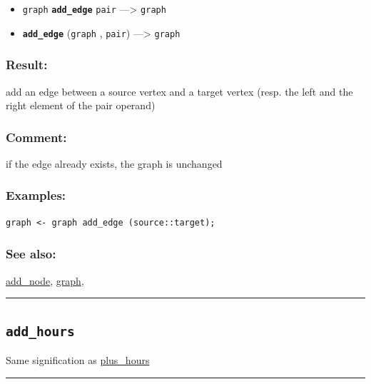 \documentclass[]{book}
\providecommand{\tightlist}{%
  \setlength{\itemsep}{0pt}\setlength{\parskip}{0pt}}
\theoremstyle{definition}
\theoremstyle{definition}
\theoremstyle{definition}
\theoremstyle{remark}
\begin{document}
\begin{itemize}
\tightlist
\item
  \texttt{graph} \textbf{\texttt{add\_edge}} \texttt{pair}
  ---\textgreater{} \texttt{graph}
\item
  \textbf{\texttt{add\_edge}} (\texttt{graph} , \texttt{pair})
  ---\textgreater{} \texttt{graph}
\end{itemize}

\subsubsection{Result:}\label{result-19}

add an edge between a source vertex and a target vertex (resp. the left
and the right element of the pair operand)

\subsubsection{Comment:}\label{comment-3}

if the edge already exists, the graph is unchanged

\subsubsection{Examples:}\label{examples-15}

\begin{verbatim}
graph <- graph add_edge (source::target); 
\end{verbatim}

\subsubsection{See also:}\label{see-also-16}

\href{operators-a-to-a.html\#add_node}{add\_node},
\href{operators-d-to-h.html\#graph}{graph},

\begin{center}\rule{0.5\linewidth}{\linethickness}\end{center}

\subsection{\texorpdfstring{\texttt{add\_hours}}{add\_hours}}\label{add_hours}

Same signification as
\href{operators-n-to-r.html\#plus_hours}{plus\_hours}

\begin{center}\rule{0.5\linewidth}{\linethickness}\end{center}
\end{document}
